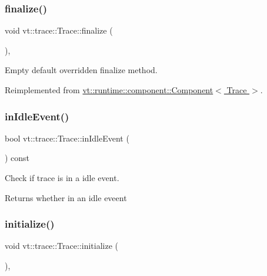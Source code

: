 \subsubsection{\texorpdfstring{finalize()}{finalize()}}
{\footnotesize\ttfamily void vt\+::trace\+::\+Trace\+::finalize (\begin{DoxyParamCaption}{ }\end{DoxyParamCaption})\hspace{0.3cm}{\ttfamily [override]}, {\ttfamily [virtual]}}



Empty default overridden finalize method. 



Reimplemented from \hyperlink{structvt_1_1runtime_1_1component_1_1_component_a098e362de01af6054e5491fba671a959}{vt\+::runtime\+::component\+::\+Component$<$ Trace $>$}.

\mbox{\label{structvt_1_1trace_1_1_trace_a1e7429d95dbddd9f235a02800d158d36}} 
\subsubsection{\texorpdfstring{in\+Idle\+Event()}{inIdleEvent()}}
{\footnotesize\ttfamily bool vt\+::trace\+::\+Trace\+::in\+Idle\+Event (\begin{DoxyParamCaption}{ }\end{DoxyParamCaption}) const}



Check if trace is in a idle event. 

\begin{DoxyReturn}{Returns}
whether in an idle eveent 
\end{DoxyReturn}
\mbox{\label{structvt_1_1trace_1_1_trace_a24019edd964c0a307008f8d6a0f1f825}} 
\subsubsection{\texorpdfstring{initialize()}{initialize()}}
{\footnotesize\ttfamily void vt\+::trace\+::\+Trace\+::initialize (\begin{DoxyParamCaption}{ }\end{DoxyParamCaption})\hspace{0.3cm}{\ttfamily [override]}, {\ttfamily [virtual]}}



